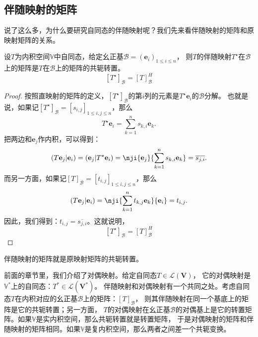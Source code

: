 \documentclass[12pt,UTF8,fontset=none]{ctexbook}
\begin{document}
\subsection{伴随映射的矩阵}
说了这么多，为什么要研究自同态的伴随映射呢？我们先来看伴随映射的矩阵和原映射矩阵的关系。
\begin{pp}\label{pp:8_5}
    设$T$为内积空间$\mathbb{V}$中自同态，给定幺正基$\mathcal{B} = (\mathbf{e}_i)_{1 \leqslant i \leqslant n}$，
    则$T$的伴随映射$T^\star$在$\mathcal{B}$上的矩阵是$T$在$\mathcal{B}$上的矩阵的共轭转置。
    $$ [T^\star]_\mathcal{B} = [T]_\mathcal{B}^H $$
\end{pp}
\begin{proof} %
    按照直映射的矩阵的定义，$[T^\star]_\mathcal{B}$的第$i$列的元素是$T^\star \mathbf{e}_i$的$\mathcal{B}$分解。
    也就是说，如果记$[T^\star]_\mathcal{B} = [s_{i,j}]_{1 \leqslant i, j \leqslant n}$，那么
    $$ T^\star \mathbf{e}_i = \sum_{k=1}^n s_{k,i} \mathbf{e}_k. $$
    把两边和$\mathbf{e}_j$作内积，可以得到：
    $$ (T\mathbf{e}_j | \mathbf{e}_i) = (\mathbf{e}_j | T^\star \mathbf{e}_i) =\nji{ \mathbf{e}_j }{ \sum_{k=1}^n s_{k,i} \mathbf{e}_k } = \overline{s_{j,i}}.$$
    而另一方面，如果记$[T]_\mathcal{B} = [t_{i,j}]_{1 \leqslant i, j \leqslant n}$，那么
    $$ (T\mathbf{e}_j | \mathbf{e}_i) = \nji{ \sum_{k=1}^n t_{k,j} \mathbf{e}_k }{ \mathbf{e}_i } = t_{i,j}. $$
    因此，我们得到：$t_{i,j} = \overline{s_{j,i}}$。这就说明，
    $$ [T^\star]_\mathcal{B} = [T]_\mathcal{B}^H $$
\end{proof}

伴随映射的矩阵就是原映射矩阵的共轭转置。

前面的章节里，我们介绍了对偶映射。给定自同态$T\in\mathcal{L}(\mathbf{V})$，
它的对偶映射是$\mathbb{V}^*$上的自同态：$T^* \in \mathcal{L}(\mathbf{V}^*)$。
伴随映射和对偶映射有一个共同之处。考虑自同态$T$在内积对应的幺正基$\mathcal{B}$上的矩阵：$[T]_\mathcal{B}$，
则其伴随映射在同一个基底上的矩阵是它的共轭转置；另一方面，
$T$的对偶映射在幺正基$\mathcal{B}$的对偶基上是它的转置矩阵。如果$\mathbb{V}$是实内积空间，那么共轭转置就是转置矩阵，
于是对偶映射的矩阵和伴随映射的矩阵相同。如果$\mathbb{V}$是复内积空间，那么两者之间差一个共轭变换。
\end{document}
